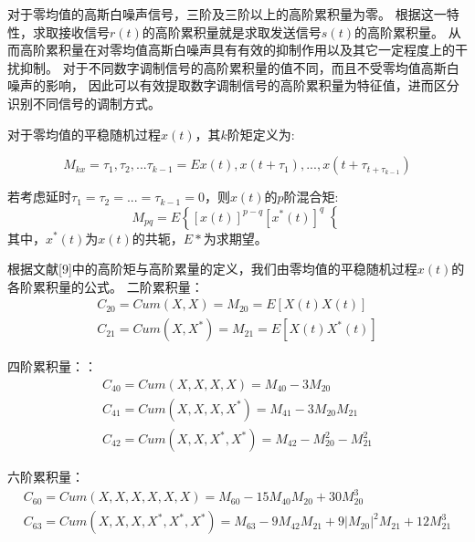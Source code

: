 对于零均值的高斯白噪声信号，三阶及三阶以上的高阶累积量为零。
根据这一特性，求取接收信号$r(t)$的高阶累积量就是求取发送信号$s(t)$的高阶累积量。
从而高阶累积量在对零均值高斯白噪声具有有效的抑制作用以及其它一定程度上的干扰抑制。
对于不同数字调制信号的高阶累积量的值不同，而且不受零均值高斯白噪声的影响，
因此可以有效提取数字调制信号的高阶累积量为特征值，进而区分识别不同信号的调制方式。\par

对于零均值的平稳随机过程$x(t)$，其$k$阶矩定义为:\par
\begin{equation}
M_{kx} = \tau_1, \tau_2, ... \tau_{k-1} = E{x(t), x(t+\tau_1), ..., x(t+\tau_{t+\tau_{k-1}})}
\end{equation}

若考虑延时$\tau_1 = \tau_2 = ... = \tau_{k-1} = 0$，则$x(t)$的$p$阶混合矩:
\begin{equation}
M_{pq} = E\left\lbrace \left[ x(t)\right]^{p-q} 
\left[ x^*(t)\right]^{q}\right\lbrace 
\end{equation}
其中，$x^*(t)$为$x(t)$的共轭，$E{*}$为求期望。\par
根据文献[9]中的高阶矩与高阶累量的定义，我们由零均值的平稳随机过程$x(t)$的各阶累积量的公式。
二阶累积量：
\begin{equation}
\begin{aligned}
C_{20} = Cum(X, X) = M_{20} = E[X(t)X(t)]\\
C_{21} = Cum(X, X^*) = M_{21} = E[X(t)X^*(t)]	
\end{aligned}
\end{equation}

四阶累积量：：
\begin{equation}
\begin{aligned}
C_{40}=Cum(X, X, X, X) = M_{40} - 3M_{20}\\
C_{41}=Cum(X, X, X, X^*) = M_{41} - 3M_{20}M_{21}\\
C_{42}=Cum(X, X, X^*, X^*) = M_{42} - M_{20}^2 - M_{21}^2
\end{aligned}
\end{equation}

六阶累积量：
\begin{equation}
\begin{aligned}
C_{60}=Cum(X, X, X, X, X, X) = M_{60} - 15M_{40}M_{20} + 30M_{20}^3\\
C_{63}=Cum(X, X, X, X^*, X^*, X^*) = M_{63} - 9M_{42}M_{21} 
+ 9\left|M_{20}\right|^2M_{21} + 12M_{21}^3
\end{aligned}
\end{equation}

